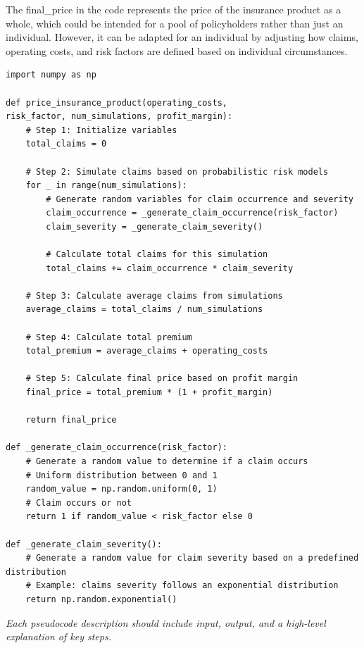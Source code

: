 \documentclass[12pt]{exam}
\begin{document}
\begin{questions}
\begin{itemize}
    The final\_price in the code represents the price of the insurance product as a whole, which could be intended for a pool of policyholders rather than just an individual. However, it can be adapted for an individual by adjusting how claims, operating costs, and risk factors are defined based on individual circumstances. \\

    \begin{lstlisting}
import numpy as np

def price_insurance_product(operating_costs, 
risk_factor, num_simulations, profit_margin):
    # Step 1: Initialize variables
    total_claims = 0

    # Step 2: Simulate claims based on probabilistic risk models
    for _ in range(num_simulations):
        # Generate random variables for claim occurrence and severity
        claim_occurrence = _generate_claim_occurrence(risk_factor)
        claim_severity = _generate_claim_severity()

        # Calculate total claims for this simulation
        total_claims += claim_occurrence * claim_severity

    # Step 3: Calculate average claims from simulations
    average_claims = total_claims / num_simulations

    # Step 4: Calculate total premium
    total_premium = average_claims + operating_costs

    # Step 5: Calculate final price based on profit margin
    final_price = total_premium * (1 + profit_margin)

    return final_price

def _generate_claim_occurrence(risk_factor):
    # Generate a random value to determine if a claim occurs
    # Uniform distribution between 0 and 1
    random_value = np.random.uniform(0, 1)  
    # Claim occurs or not
    return 1 if random_value < risk_factor else 0  

def _generate_claim_severity():
    # Generate a random value for claim severity based on a predefined distribution
    # Example: claims severity follows an exponential distribution
    return np.random.exponential()  
    \end{lstlisting}

    
\end{itemize}

\textit{Each pseudocode description should include input, output, and a high-level explanation of key steps.}




\end{questions}
\end{document}
